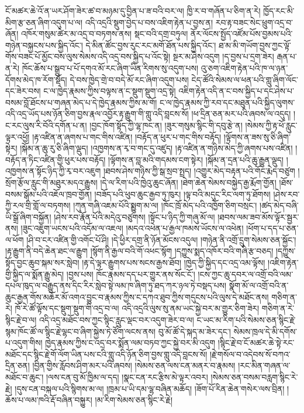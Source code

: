 \documentclass{article}
\begin{document}
ངོ་མཚར་ཆེ་འོ་ན་ཡར་ཤོག་ཟེར་ཚ་བ་མཉམ་དུ་བྱིན་པ་ཟ་བའི་བར་ལ། ཁྱི་ར་བ་གཞོན་པ་ཅིག་ན་རེ། ཁྱོད་རང་མི་མིག་རྩ་ཅན་ཞིག་འདུག་པ་ལ། འདི་འདྲའི་སྡུག་བྱེད་པ་བས་འཇིག་རྟེན་པ་བྱས་ན། རབ་རྟ་བཟང་སེང་ཕྲུག་འདྲ་བ་ཞོན། འཁོར་གསུམ་ཚེར་མ་འདྲ་བ་བཏགས་ནས། སྡང་བའི་དགྲ་བཏུལ། ནོར་ལོངས་སྤྱོད་འཛོམ་པོས་བྱམས་པའི་གཉེན་བསྐྱངས་པས་སྐྱིད་འོང་། དེ་མིན་ཚོང་བྱས་རུང་རང་མགོ་ཐོན་པས་སྐྱིད་འོང་། ཐ་མ་མི་གཡོག་བྱས་ཀྱང་ལྟོ་གོས་བཟང་པོ་མྱོང་བས་ལུས་སེམས་འདི་འདྲ་བས་སྐྱིད་པ་འོང་སྟེ། སྔར་མ་ཤེས་འདུག །ད་བྱས་པ་དྲག་ཟེར། རྒན་པ་ན་རེ། ཁོང་ཆོས་པ་སྒྲུབ་པ་པོ་དགའ་མོ་རང་ཞིག་ཡིན་རིགས་སུ་འདུག་པས། འུ་ཅག་འཇིག་རྟེན་པའི་ཁ་ལ་ཉན་དོགས་མེད་ཁ་རོག་སྡོད། དེ་བས་ཁྱེད་གྲེ་བ་བདེ་མོ་རང་ཞིག་འདུག་པས། ངེད་ཚོའི་སེམས་ལ་ཕན་པའི་གླུ་ཞིག་ལོང་དང་ཟེར་བས། ང་ལ་ཁྱེད་རྣམས་ཀྱིས་བལྟས་ན་ང་སྡུག་སྡུག་འདྲ་སྟེ། འཇིག་རྟེན་འདི་ན་ང་བས་སྐྱིད་པ་དང་ཤེས་པ་བསམ་བློ་ཐོངས་པ་གཞན་མེད་པ་དེ་ཁྱེད་རྣམས་ཀྱིས་མ་གོ། ང་ལ་ཁྱེད་རྣམས་ཀྱི་རབ་དང་མཐུན་པའི་སྐྱིད་ལུགས་འདི་འདྲ་ཡོད་པས་ཉོན་ཅིག་བྱས་རྣལ་འབྱོར་རྟ་རྒྱུག་གི་གླུ་འདི་བླངས་སོ། །ཕ་དྲིན་ཅན་མར་པའི་ཞབས་ལ་འདུད། །ང་རང་ལུས་རི་བོའི་དགོན་པ་ན། །བྱང་ཁོག་སྟོད་ཀྱི་ལྷ་ཁང་ན། །ཟུར་གསུམ་སྙིང་གི་དབུ་རྩེ་ན། །སེམས་ཀྱི་རྟ་ཕོ་རླུང་ལྟར་འཕྱོ། །རྟ་འཛིན་ན་ཞགས་པ་གང་གིས་འཛིན། །བརྟོད་ན་ཕུར་པ་གང་གིས་བརྟོད། །ལྟོགས་ན་ཟས་སུ་ཅི་ཞིག་སྟེར། །སྐོམ་ན་ཆུ་རུ་ཅི་ཞིག་ལྡུད། །འཁྱགས་ན་རྭ་བ་གང་དུ་འཛུད། །རྟ་འཛིན་ན་གཉིས་མེད་ཀྱི་ཞགས་པས་འཛིན། །བརྟོད་ན་ཏིང་འཛིན་གྱི་ཕུར་པས་བརྟོད། །ལྟོགས་ན་བླ་མའི་གདམས་ངག་སྟེར། །སྐོམ་ན་དྲན་པའི་ཆུ་རྒྱུན་ལྡུད། །འཁྱགས་ན་སྟོང་ཉིད་ཀྱི་རྭ་བར་འཇུག །ཐབས་ཤེས་གཉིས་ཀྱི་སྒ་སྲབ་སྤྲད། །འགྱུར་མེད་བརྟན་པའི་གོང་རྨེད་བཙུག །སྲོག་རྩོལ་རླུང་གི་མཐུར་མདའ་རྒྱུས། །དེ་ལ་རིག་པའི་ཁྱེའུ་ཆུང་ཞོན། །ཐེག་ཆེན་སེམས་བསྐྱེད་རྒྱ་རྨོག་གྱོན། །ཐོས་བསམ་སྒོམ་པའི་འཇོལ་ཁྲབ་གྱོན། །བཟོད་པའི་ཕུབ་ཆུང་རྒྱབ་ཏུ་ཁུར། །ལྟ་བའི་མདུང་རིང་ལག་ཏུ་ཐོགས། །ཤེས་རབ་ཀྱི་རལ་གྲི་གློ་ལ་བཏགས། །ཀུན་གཞི་འཇམ་པོའི་སྨྱུག་མ་ལ། །ཁོང་ཁྲོ་མེད་པའི་འཁྱོག་ཅིག་བསྲང་། །ཚད་མེད་བཞི་ཡི་སྒྲོ་ཞིག་བསྐྱོན། །ཤེས་རབ་རྣོན་པོའི་མདེའུ་བཙུགས། །སྟོང་པ་ཉིད་ཀྱི་གཞུ་མོ་ལ། །ཐབས་ལམ་ཟབ་མོས་ལྟོར་སྦྱར་ནས། །ཟུང་འཇུག་ཡངས་པའི་འདོམ་ལ་འཇལ། །མདའ་འཕེན་པ་རྒྱལ་ཁམས་ཡོངས་ལ་འཕེན། །ཕོག་པ་དད་པ་ཅན་ལ་ཕོག །ཤི་བ་ངར་འཛིན་གྱི་འགོང་པོ་ཤི། །དེ་ཕྱིར་དགྲ་ནི་ཉོན་མོངས་འདུལ། །གཉེན་ནི་འགྲོ་དྲུག་སེམས་ཅན་སྐྱོང་། །རྟ་རྒྱུག་ནི་བདེ་ཆེན་ཐང་ལ་རྒྱུག །སྙོག་ནི་རྒྱལ་བའི་གོ་འཕང་སྙོག །དཀྱུས་སྨད་འཁོར་བའི་གཞི་རྩ་བཅད། །དཀྱུས་སྟོད་བྱང་ཆུབ་སྐམ་སར་སླེབ། །རྟ་དེ་ལྟར་རྒྱུགས་པས་སངས་རྒྱས་ཐོབ། །ཁྱེད་ཀྱི་སྐྱིད་དང་འདྲ་འམ་ལྟོས། །འཇིག་རྟེན་གྱི་སྐྱིད་ལ་སྨོན་རྒྱུ་མེད། །བྱས་པས། ཁོང་རྣམས་དད་པར་གྱུར་ནས་སོང་ངོ་། །ངས་ཀྱང་ཆུ་དབར་ལ་འགྲོ་བའི་ལམ་དཔལ་ཁུད་ལ་བརྒྱུད་ནས་དིང་རིར་སླེབ་སྟེ་ལམ་ཁ་ཞིག་ཏུ་ཐད་ཀར་ཉལ་ཏེ་བསྡད་པས། སྣོག་མོ་ལ་འགྲོ་བའི་ན་ཆུང་རྒྱན་གོས་མཆོར་མོ་འགའ་བྱུང་བ་རྣམས་ཀྱིས་ང་དཀའ་ཐུབ་ཀྱིས་གདུངས་པའི་ལུས་དེ་མཐོང་ནས། གཅིག་ན་རེ། ཁོ་རེ་ཚོ་ལྟོས་དང་སྡུག་སྡུག་གི་འདྲ་བ་ལ། འདི་འདྲའི་ལུས་སུ་ནམ་ཡང་སྐྱེ་བར་མ་གྱུར་ཅིག་ཟེར། གཅིག་ན་རེ་སྙིང་རྗེ་བ་ལ། འདི་འདྲ་མཐོང་བས་ཀྱང་སྙིང་རླུང་ལྡང་བར་འདུག་ཟེར་བ་ལ། ང་ཡང་མ་རིག་པའི་སེམས་ཅན་སྙིང་རྗེ་སྙམ་ཁོང་ཚོ་ལ་སྙིང་རྗེ་ལྷང་བ་ཞིག་སྐྱེས་ཏེ་ཙོག་ལངས་ནས། བུ་མོ་ཚོ་དེ་སྐད་མ་ཟེར་དང་། སེམས་ཁྲལ་དེ་མི་དགོས་པ་འདུག་གིས། ཁྱེད་རྣམས་ཀྱིས་ང་འདྲ་བར་སྨོན་ལམ་བཏབ་ཀྱང་སྐྱེ་བར་མི་འདུག །སྙིང་རྗེ་བ་ངོ་མཚར་ཆེ་སྟེ་རང་མཐོང་དང་སྙིང་རྗེ་གོ་ལོག་ཡིན་པས་ངའི་གླུ་འདི་ཉོན་ཅིག་བྱས་གླུ་འདི་བླངས་སོ། །རྗེ་གསོལ་བ་འདེབས་སོ་བཀའ་དྲིན་ཅན། །བྱིན་གྱིས་རློབས་ཤིག་མར་པའི་ཞབས། །སེམས་ཅན་ལས་ངན་མནར་བ་རྣམས། །རང་མིན་གཞན་ལ་མཐོང་བ་ཆུང་། །ལས་ངན་བུ་མོ་ཁྱིམ་ལ་དད། །སྣང་ངན་རང་རྩིས་མེ་ལྟར་འབར། །སེམས་ཅན་བསམ་བརླག་སྙིང་རེ་རྗེ། །དུས་ངན་བསྐལ་པའི་སྙིགས་མ་ལ། །ཁྲམ་པ་ཡི་དམ་ལྷ་བཞིན་མཆོད། །ཟོག་པོ་རིན་ཆེན་གསེར་ལས་བྲིན། །ཆོས་པ་ལམ་ཁའི་རྡོ་བཞིན་བསྐྱུར། །མ་རིག་སེམས་ཅན་སྙིང་རེ་རྗེ། 
\end{document}
